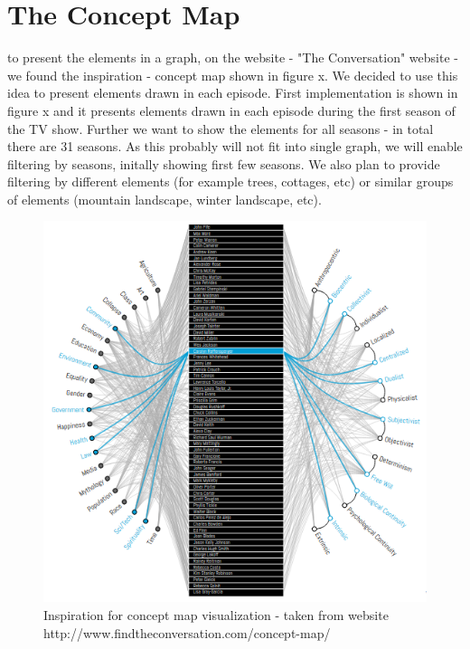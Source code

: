 \documentclass[a4paper]{tufte-book}
\begin{document}
\section{The Concept Map}
 to present the elements in a graph, on the website 
 - "The Conversation" website -  we found the inspiration - concept map shown in figure x. We decided to use this idea to present elements drawn in each episode. First implementation is shown in figure x and it presents elements drawn in each episode during the first season of the TV show. Further we want to show the elements for all seasons - in total there are 31 seasons. As this probably will not fit into single graph, we will enable filtering by seasons, initally showing first few seasons. We also plan to provide filtering by different elements (for example trees, cottages, etc) or similar groups of elements (mountain landscape, winter landscape, etc).

\begin{figure}
	\includegraphics{Images/conceptMapIdea.png}
	\caption{Inspiration for concept map visualization - taken from website http://www.findtheconversation.com/concept-map/}
	\label{fig:concept1}
\end{figure}
\end{document}
